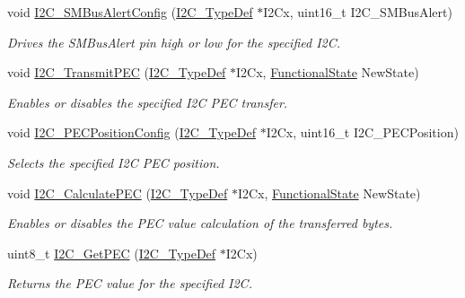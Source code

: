 \begin{DoxyCompactItemize}
void \hyperlink{group___i2_c___exported___functions_ga75a810776d9710d2f6d9c5d9e93241c6}{I2\+C\+\_\+\+S\+M\+Bus\+Alert\+Config} (\hyperlink{struct_i2_c___type_def}{I2\+C\+\_\+\+Type\+Def} $\ast$I2\+Cx, uint16\+\_\+t I2\+C\+\_\+\+S\+M\+Bus\+Alert)
\begin{DoxyCompactList}\small\item\em Drives the S\+M\+Bus\+Alert pin high or low for the specified I2C. \end{DoxyCompactList}\item 
void \hyperlink{group___i2_c___exported___functions_gaa27d1440290fe601e730b6980999afe3}{I2\+C\+\_\+\+Transmit\+P\+EC} (\hyperlink{struct_i2_c___type_def}{I2\+C\+\_\+\+Type\+Def} $\ast$I2\+Cx, \hyperlink{group___exported__types_gac9a7e9a35d2513ec15c3b537aaa4fba1}{Functional\+State} New\+State)
\begin{DoxyCompactList}\small\item\em Enables or disables the specified I2C P\+EC transfer. \end{DoxyCompactList}\item 
void \hyperlink{group___i2_c___exported___functions_ga5d0f939bdd45542502827bf408f24161}{I2\+C\+\_\+\+P\+E\+C\+Position\+Config} (\hyperlink{struct_i2_c___type_def}{I2\+C\+\_\+\+Type\+Def} $\ast$I2\+Cx, uint16\+\_\+t I2\+C\+\_\+\+P\+E\+C\+Position)
\begin{DoxyCompactList}\small\item\em Selects the specified I2C P\+EC position. \end{DoxyCompactList}\item 
void \hyperlink{group___i2_c___exported___functions_gae86801251359226c35745e0a258388b0}{I2\+C\+\_\+\+Calculate\+P\+EC} (\hyperlink{struct_i2_c___type_def}{I2\+C\+\_\+\+Type\+Def} $\ast$I2\+Cx, \hyperlink{group___exported__types_gac9a7e9a35d2513ec15c3b537aaa4fba1}{Functional\+State} New\+State)
\begin{DoxyCompactList}\small\item\em Enables or disables the P\+EC value calculation of the transferred bytes. \end{DoxyCompactList}\item 
uint8\+\_\+t \hyperlink{group___i2_c___exported___functions_ga7bf75e7c27c0e1d73e70fc0e1c7cd1dd}{I2\+C\+\_\+\+Get\+P\+EC} (\hyperlink{struct_i2_c___type_def}{I2\+C\+\_\+\+Type\+Def} $\ast$I2\+Cx)
\begin{DoxyCompactList}\small\item\em Returns the P\+EC value for the specified I2C. \end{DoxyCompactList}\item 

\end{DoxyCompactItemize}
